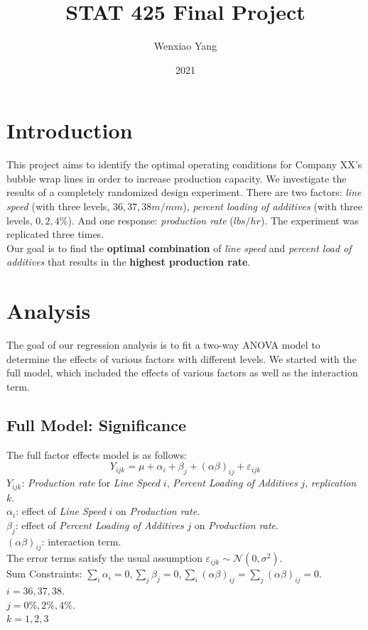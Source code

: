 \documentclass[11pt,a4paper]{article}
\title{STAT 425 Final Project}
\author[*]{Wenxiao Yang}
\affil[*]{Department of Mathematics, University of Illinois at Urbana-Champaign}
\date{2021}
\begin{document}
\maketitle

\section{Introduction}
This project aims to identify the optimal operating conditions for Company XX's bubble wrap lines in order to increase production capacity. We investigate the results of a completely randomized design experiment. There are two factors: \textit{line speed} (with three levels, $36,37,38 m/mm$), \textit{percent loading of additives} (with three levels, $0,2,4\%$). And one response: \textit{production rate} ($lbs/hr$). The experiment was replicated three times.\\
Our goal is to find the \textbf{optimal combination} of \textit{line speed} and \textit{percent load of additives} that results in the \textbf{highest production rate}.


\section{Analysis}
The goal of our regression analysis is to fit a two-way ANOVA model to determine the effects of various factors with different levels. We started with the full model, which included the effects of various factors as well as the interaction term.

\subsection{Full Model: Significance}
The full factor effects model is as follows:
$$Y_{ijk}=\mu+\alpha_i+\beta_j+(\alpha\beta)_{ij}+\varepsilon_{ijk}$$
$Y_{ijk}$: \textit{Production rate} for \textit{Line Speed} $i$, \textit{Percent Loading of Additives} $j$, \textit{replication} $k$.\\
$\alpha_i$: effect of \textit{Line Speed} $i$ on \textit{Production rate}.\\
$\beta_j$: effect of \textit{Percent Loading of Additives} $j$ on \textit{Production rate}.\\
$(\alpha\beta)_{ij}$: interaction term.\\
The error terms satisfy the usual assumption $\varepsilon_{i j k} \sim \mathcal{N}\left(0, \sigma^{2}\right)$.\\
Sum Constraints: $\sum_{i} \alpha_{i}=0, \sum_{j} \beta_{j}=0, \sum_{i}(\alpha \beta)_{i j}=\sum_{j}(\alpha \beta)_{i j}=0$.\\
$i=36,37,38.$\\
$j=0\%,2\%,4\%.$\\
$k=1,2,3$\\
\end{document}
